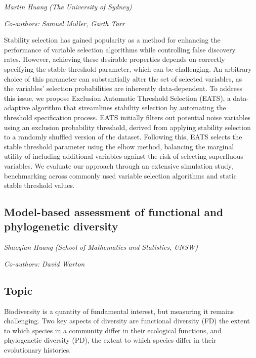 \documentclass[
]{scrreprt}
\begin{document}
\emph{Martin Huang} \emph{(The University of
Sydney)}

\emph{Co-authors: Samuel Muller, Garth Tarr}

\setlength{\parskip}{0.5em}

Stability selection has gained popularity as a method for enhancing the
performance of variable selection algorithms while controlling false
discovery rates. However, achieving these desirable properties depends
on correctly specifying the stable threshold parameter, which can be
challenging. An arbitrary choice of this parameter can substantially
alter the set of selected variables, as the variables' selection
probabilities are inherently data-dependent. To address this issue, we
propose Exclusion Automatic Threshold Selection (EATS), a data-adaptive
algorithm that streamlines stability selection by automating the
threshold specification process. EATS initially filters out potential
noise variables using an exclusion probability threshold, derived from
applying stability selection to a randomly shuffled version of the
dataset. Following this, EATS selects the stable threshold parameter
using the elbow method, balancing the marginal utility of including
additional variables against the risk of selecting superfluous
variables. We evaluate our approach through an extensive simulation
study, benchmarking across commonly used variable selection algorithms
and static stable threshold values.

\subsection{Model-based assessment of functional and phylogenetic
diversity}\label{model-based-assessment-of-functional-and-phylogenetic-diversity}

\emph{Shaoqian Huang} \emph{(School of
Mathematics and Statistics, UNSW)}

\emph{Co-authors: David Warton}

\setlength{\parskip}{0.5em}

\subsection{Topic}\label{topic}

Biodiversity is a quantity of fundamental interest, but measuring it
remains challenging. Two key aspects of diversity are functional
diversity (FD) the extent to which species in a community differ in
their ecological functions, and phylogenetic diversity (PD), the extent
to which species differ in their evolutionary histories.
\end{document}
